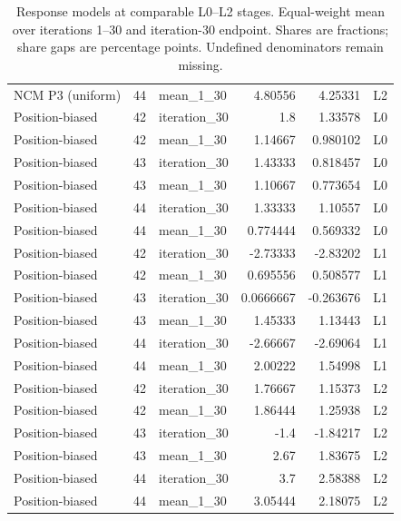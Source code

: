 \begin{table}[htbp!]
\begin{tabular}{lrlrrl}
NCM P3 (uniform) & 44 & mean\_1\_30 & 4.80556 & 4.25331 & L2 \\
Position-biased & 42 & iteration\_30 & 1.8 & 1.33578 & L0 \\
Position-biased & 42 & mean\_1\_30 & 1.14667 & 0.980102 & L0 \\
Position-biased & 43 & iteration\_30 & 1.43333 & 0.818457 & L0 \\
Position-biased & 43 & mean\_1\_30 & 1.10667 & 0.773654 & L0 \\
Position-biased & 44 & iteration\_30 & 1.33333 & 1.10557 & L0 \\
Position-biased & 44 & mean\_1\_30 & 0.774444 & 0.569332 & L0 \\
Position-biased & 42 & iteration\_30 & -2.73333 & -2.83202 & L1 \\
Position-biased & 42 & mean\_1\_30 & 0.695556 & 0.508577 & L1 \\
Position-biased & 43 & iteration\_30 & 0.0666667 & -0.263676 & L1 \\
Position-biased & 43 & mean\_1\_30 & 1.45333 & 1.13443 & L1 \\
Position-biased & 44 & iteration\_30 & -2.66667 & -2.69064 & L1 \\
Position-biased & 44 & mean\_1\_30 & 2.00222 & 1.54998 & L1 \\
Position-biased & 42 & iteration\_30 & 1.76667 & 1.15373 & L2 \\
Position-biased & 42 & mean\_1\_30 & 1.86444 & 1.25938 & L2 \\
Position-biased & 43 & iteration\_30 & -1.4 & -1.84217 & L2 \\
Position-biased & 43 & mean\_1\_30 & 2.67 & 1.83675 & L2 \\
Position-biased & 44 & iteration\_30 & 3.7 & 2.58388 & L2 \\
Position-biased & 44 & mean\_1\_30 & 3.05444 & 2.18075 & L2 \\
\hline
\end{tabular}
\caption{Response models at comparable L0--L2 stages. Equal-weight mean over iterations 1--30 and iteration-30 endpoint. Shares are fractions; share gaps are percentage points. Undefined denominators remain missing.}
\label{chap:results:tab:rq2_models_selection}
\end{table}
